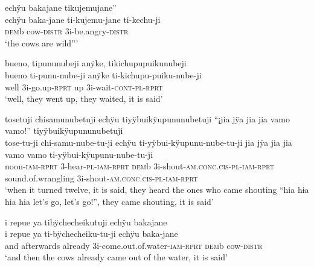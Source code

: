 \ea%
\begingl 
\glpreamble echÿu bakajane tikujemujane”\\
\gla echÿu baka-jane ti-kujemu-jane ti-kechu-ji\\ 
\glb \textsc{dem}b cow-\textsc{distr} 3i-be.angry-\textsc{distr}\\ 
\glft ‘the cows are wild”’\\ 
\endgl
\xe

\ea%
\begingl 
\glpreamble bueno, tipununubeji anÿke, tikichupupuikunubeji\\
\gla  bueno ti-punu-nube-ji anÿke ti-kichupu-puiku-nube-ji\\ 
\glb well 3i-go.up-\textsc{rprt} up 3i-wait-\textsc{cont}-\textsc{pl}-\textsc{rprt}\\ 
\glft ‘well, they went up, they waited, it is said’\\ 
\endgl
\xe

\ea%
\begingl 
\glpreamble tosetuji chisamunubetuji echÿu tiyÿbuikÿupununubetuji “¡jia jÿa jia jia vamo vamo!” tiyÿbuikÿupununubetuji\\
\gla tose-tu-ji chi-samu-nube-tu-ji echÿu ti-yÿbui-kÿupunu-nube-tu-ji {jia jÿa jia jia vamo vamo} ti-yÿbui-kÿupunu-nube-tu-ji\\ 
\glb noon-\textsc{iam}-\textsc{rprt} 3-hear-\textsc{pl}-\textsc{iam}-\textsc{rprt} \textsc{dem}b 3i-shout-\textsc{am.conc.cis}-\textsc{pl}-\textsc{iam}-\textsc{rprt} {sound.of.wrangling} 3i-shout-\textsc{am.conc.cis}-\textsc{pl}-\textsc{iam}-\textsc{rprt}\\ 
\glft ‘when it turned twelve, it is said, they heard the ones who came shouting “hia hɨa hia hia let’s go, let’s go!”, they came shouting, it is said’\\ 
\endgl
\xe

\ea%
\begingl 
\glpreamble i repue ya tibÿchecheikutuji echÿu bakajane\\
\gla i repue ya ti-bÿchecheiku-tu-ji echÿu baka-jane\\ 
\glb and afterwards already 3i-come.out.of.water-\textsc{iam}-\textsc{rprt} \textsc{dem}b cow-\textsc{distr}\\ 
\glft ‘and then the cows already came out of the water, it is said’\\ 
\endgl
\xe

